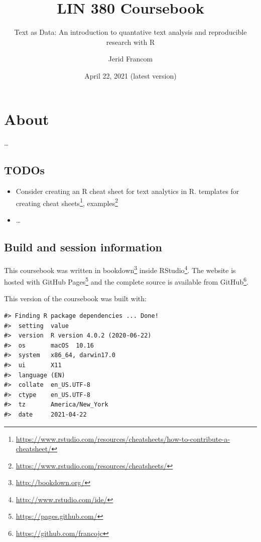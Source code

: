 \documentclass[
]{article}
\title{LIN 380 Coursebook}
\subtitle{Text as Data: An introduction to quantative text analysis and reproducible research with R}
\author{Jerid Francom}
\date{April 22, 2021 (latest version)}
\DeclareRobustCommand{\href}[2]{#2\footnote{\url{#1}}}
\providecommand{\tightlist}{%
  \setlength{\itemsep}{0pt}\setlength{\parskip}{0pt}}
\begin{document}
\maketitle

{
\setcounter{tocdepth}{2}
\tableofcontents
}
\hypertarget{about}{%
\section*{About}\label{about}}

\ldots{}

\hypertarget{todos}{%
\subsection*{TODOs}\label{todos}}

\begin{itemize}
\tightlist
\item
  Consider creating an R cheat sheet for text analytics in R. \href{https://www.rstudio.com/resources/cheatsheets/how-to-contribute-a-cheatsheet/}{templates for creating cheat sheets}, \href{https://www.rstudio.com/resources/cheatsheets/}{examples}
\item
  \ldots{}
\end{itemize}

\hypertarget{build-and-session-information}{%
\subsection*{Build and session information}\label{build-and-session-information}}

This coursebook was written in \href{http://bookdown.org/}{bookdown} inside \href{http://www.rstudio.com/ide/}{RStudio}. The website is hosted with \href{https://pages.github.com/}{GitHub Pages} and the complete source is available from \href{https://github.com/francojc}{GitHub}.

This version of the coursebook was built with:

\begin{verbatim}
#> Finding R package dependencies ... Done!
#>  setting  value                       
#>  version  R version 4.0.2 (2020-06-22)
#>  os       macOS  10.16                
#>  system   x86_64, darwin17.0          
#>  ui       X11                         
#>  language (EN)                        
#>  collate  en_US.UTF-8                 
#>  ctype    en_US.UTF-8                 
#>  tz       America/New_York            
#>  date     2021-04-22
\end{verbatim}
\end{document}
